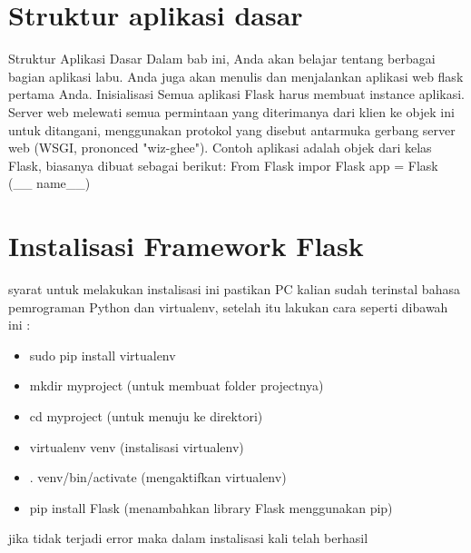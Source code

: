 \section{Struktur aplikasi dasar}
Struktur Aplikasi Dasar 
Dalam bab ini, Anda akan belajar tentang berbagai bagian aplikasi labu. Anda juga akan menulis dan menjalankan aplikasi web flask pertama Anda. 
Inisialisasi 
Semua aplikasi Flask harus membuat instance aplikasi. Server web melewati semua permintaan yang diterimanya dari klien ke objek ini untuk ditangani, menggunakan protokol yang disebut antarmuka gerbang server web (WSGI, prononced "wiz-ghee"). Contoh aplikasi adalah objek dari kelas Flask, biasanya dibuat sebagai berikut: 
From Flask impor Flask 
app = Flask (__ name__)

\section{Instalisasi Framework Flask}
syarat untuk melakukan instalisasi ini pastikan PC kalian sudah terinstal bahasa pemrograman Python dan virtualenv, setelah
itu lakukan cara seperti dibawah ini :
\begin{itemize}
\item sudo pip install virtualenv 
\item mkdir myproject (untuk membuat folder projectnya)
\item cd myproject (untuk menuju ke direktori)
\item virtualenv venv (instalisasi virtualenv)
\item . venv/bin/activate (mengaktifkan virtualenv)
\item pip install Flask (menambahkan library Flask menggunakan pip)
\end{itemize}
jika tidak terjadi error maka dalam instalisasi kali telah berhasil



